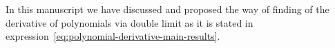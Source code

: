 In this manuscript we have discussed and proposed the way of finding of the derivative of polynomials via double limit
as it is stated in expression~\eqref{eq:polynomial-derivative-main-results}.
